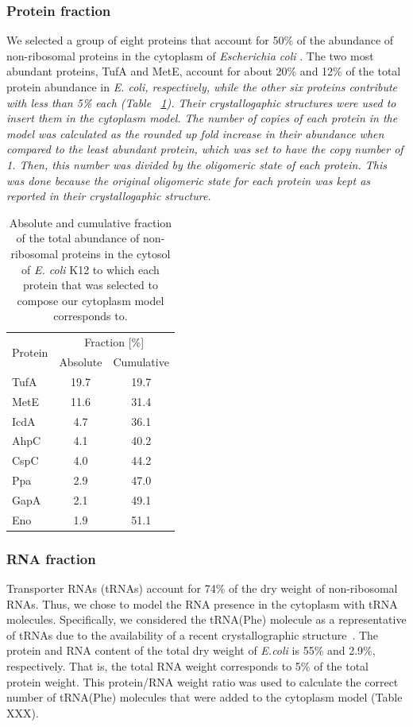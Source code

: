 \documentclass[journal=jacsat,manuscript=article]{achemso}
\begin{document}
\subsubsection{Protein fraction}
We selected a group of eight proteins that account for 50\% of the abundance of non-ribosomal proteins in the cytoplasm of {\em Escherichia coli} \cite{ref_prot_abundance}. The two most abundant proteins, TufA and MetE, account for about 20\% and 12\% of the total protein abundance in \em{E. coli}, respectively, while the other six proteins contribute with less than 5\% each (Table ~\ref{tbl:protein_fraction}). Their crystallogaphic structures were used to insert them in the cytoplasm model. The number of copies of each protein in the model was calculated as the rounded up fold increase in their abundance when compared to the least abundant protein, which was set to have the copy number of 1. Then, this number was divided by the oligomeric state of each protein. This was done because the original oligomeric state for each protein was kept as reported in their crystallogaphic structure.

\begin{table}
\centering
\begin{tabular}{ l c c }
\hline
\multirow{2}{*}{Protein} & 	\multicolumn{2}{c}{Fraction [\%]} \\
& Absolute & Cumulative \\ 
\hline
TufA & 19.7 & 19.7 \\
MetE & 11.6 & 31.4 \\
IcdA & 4.7  & 36.1 \\
AhpC & 4.1  & 40.2 \\
CspC & 4.0  & 44.2 \\
Ppa  & 2.9  & 47.0 \\
GapA & 2.1  & 49.1 \\
Eno  & 1.9  & 51.1 \\
\hline
\end{tabular}
\caption{Absolute and cumulative fraction of the total abundance of non-ribosomal proteins in the cytosol of {\em E. coli} K12 to which each protein that was selected to compose our cytoplasm model corresponds to.}
\label{tbl:protein_fraction}
\end{table}


\subsubsection{RNA fraction}
Transporter RNAs (tRNAs) account for 74\% of the dry weight of non-ribosomal RNAs. Thus, we chose to model the RNA presence in the cytoplasm with tRNA molecules. Specifically, we considered the tRNA(Phe) molecule as a representative of tRNAs due to the availability of a recent crystallographic structure~\cite{Byrne2015}.
The protein and RNA content of the total dry weight of \textit{E.coli} is 55\% and 2.9\%, respectively. That is, the total RNA weight corresponds to 5\% of the total protein weight. This protein/RNA weight ratio was used to calculate the correct number of tRNA(Phe) molecules that were added to the cytoplasm model \colorbox{red!50}{(Table XXX)}.
\end{document}

